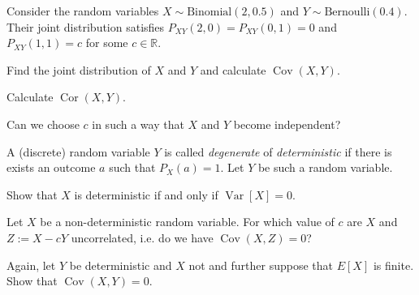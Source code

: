 \documentclass[a4paper,10pt,landscape,twocolumn]{scrartcl}
\DeclareMathOperator{\Cov}{Cov}
\DeclareMathOperator{\Cor}{Cor}
\DeclareMathOperator{\Var}{Var}
\begin{document}
\begin{exercise}[3pt]
Consider the random variables $X \sim \text{Binomial}(2, 0.5)$ and $Y \sim \text{Bernoulli}(0.4)$. Their joint distribution satisfies $P_{XY}(2,0) = P_{XY}(0,1) = 0$ and $P_{XY}(1,1) = c$ for some $c\in \mathbb R$.

	\begin{subex}[1pt]
	Find the joint distribution of $X$ and $Y$ and calculate $\Cov(X,Y)$.
	\end{subex}
	
	\begin{subex}[1pt]
	Calculate $\Cor(X,Y)$.	
	\end{subex}
	
	\begin{subex}[1pt]
	Can we choose $c$ in such a way that $X$ and $Y$ become independent?	
	\end{subex}
\end{exercise}




\begin{exercise}
A (discrete) random variable $Y$ is called \emph{degenerate} of \emph{deterministic} if there is exists an outcome $a$ such that $P_X(a) = 1$. Let $Y$ be such a random variable.

	\begin{subex}[1pt]
		Show that $X$ is deterministic if and only if $\Var[X] = 0$.	
	\end{subex}
	
	\begin{subex}[1pt]
		Let $X$ be a non-deterministic random variable. For which value of $c$ are $X$ and $Z := X - cY$ uncorrelated, i.e. do we have $\Cov(X, Z) = 0$?
	\end{subex}
	
	\begin{subex}[1pt]
		Again, let $Y$ be deterministic and $X$ not and further suppose that $E[X]$ is finite. Show that $\Cov(X,Y) = 0$.	
	\end{subex}
\end{exercise}


\end{document}

